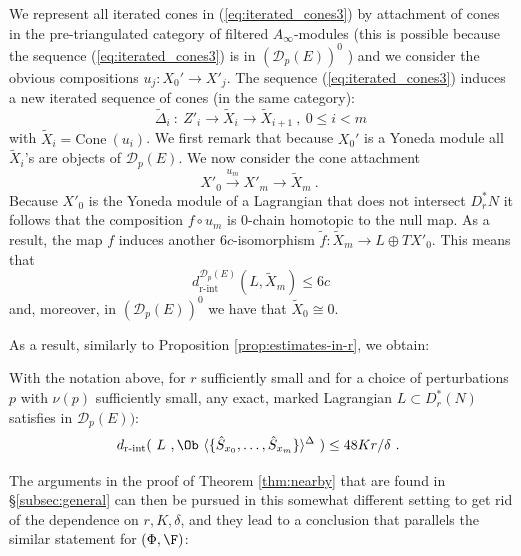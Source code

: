  We represent all iterated cones in (\ref{eq:iterated_cones3}) by attachment of cones in the pre-triangulated
 category of filtered $A_{\infty}$-modules (this is possible because the sequence (\ref{eq:iterated_cones3})  is in $(\mathscr{D}_{p}(E))^{0}$ ) and we consider the obvious compositions $u_{j}: X_{0}'\to X'_{j}$. 
 The sequence (\ref{eq:iterated_cones3}) induces a new iterated sequence of cones (in the same category):
   \begin{equation}\label{eq:iterated_cones4}
 \tilde{\Delta}_{i} \ : \ Z'_{i}\longrightarrow \tilde{X}_{i}\longrightarrow \tilde{X}_{i+1} \ , \ 0\leq i < m
\end{equation}
with $\tilde{X}_{i}= \mathrm{Cone}\ (u_{i})$. We first remark that because $X_{0}'$ is a Yoneda module all $\tilde{X}_{i}$'s are objects of $\mathscr{D}_{p}(E)$. 
We now consider the cone attachment $$X'_{0}\stackrel{u_{m}}{\longrightarrow} X'_{m} \longrightarrow \tilde{X}_{m}~.~$$ Because $X'_{0}$ is the Yoneda module of a Lagrangian that does not intersect $D^{\ast}_{r}N$ it follows
that the composition $f\circ u_{m}$ is $0$-chain homotopic to the null map. As a result, the map $f$ induces
another $6c$-isomorphism $\tilde{f}:\tilde{X}_{m}\to L\oplus TX'_{0}$. This means that 
$$d_{\text{r-int}}^{\mathscr{D}_{p}(E)}(L,\tilde{X}_{m})\leq 6c$$ and, moreover,
in $(\mathscr{D}_{p}(E))^{0}$ we have that $\tilde{X}_{0}\cong 0$. 

As a result, similarly to Proposition \ref{prop:estimates-in-r}, we obtain:
\begin{cor} \label{cor:estimate-in-r-E}
With the notation above, for $r$ sufficiently small and for a choice of perturbations $p$ with $\nu(p)$ sufficiently small, any exact, marked Lagrangian $L\subset D^{\ast}_{r}(N)$ satisfies in $\mathscr{D}_{p}(E))$:
$$d_{\text{r-int}}(\ L\ , \Ob\  \langle\{\hat{S}_{x_{0}},\ldots, \hat{S}_{x_{m}}\} \rangle ^{\Delta}\ ) \leq 48 Kr/\delta~.~$$  
\end{cor}

The arguments in the proof of Theorem \ref{thm:nearby} that are found in \S\ref{subsec:general} can then be pursued
in this somewhat different setting to get rid of the dependence on $r, K,\delta$, and they lead to a conclusion that parallels
the similar statement for $(\Phi, \F)$:

